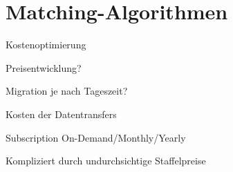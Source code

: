 


\section{Matching-Algorithmen}


Kostenoptimierung

Preisentwicklung? 

Migration je nach Tageszeit? 

Kosten der Datentransfers 

Subscription On-Demand/Monthly/Yearly 

Kompliziert durch undurchsichtige Staffelpreise


%
%
%
%
%
%


%
%
%

